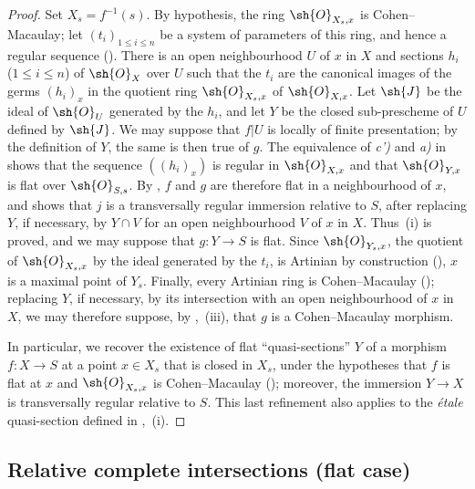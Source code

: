 \begin{proof}
Set $X_s=f^{-1}(s)$. By hypothesis, the ring $\sh{O}_{X_s,x}$ is Cohen--Macaulay; let $(t_i)_{1\leq i\leq n}$ be a system of parameters of this ring, and hence a regular sequence ().
There is an open neighbourhood $U$ of $x$ in $X$ and sections $h_i$ ($1\leq i\leq n$) of $\sh{O}_X$ over $U$ such that the $t_i$ are the canonical images of the germs $(h_i)_x$ in the quotient ring $\sh{O}_{X_s,x}$ of $\sh{O}_{X,x}$.
Let $\sh{J}$ be the ideal of $\sh{O}_U$ generated by the $h_i$, and let $Y$ be the closed sub-prescheme of $U$ defined by $\sh{J}$.
We may suppose that $f|U$ is locally of finite presentation; by the definition of $Y$, the same is then true of $g$.
The equivalence of \emph{c')} and \emph{a)} in  shows that the sequence $((h_i)_x)$ is regular in $\sh{O}_{X,x}$ and that $\sh{O}_{Y,x}$ is flat over $\sh{O}_{S,s}$. By , $f$ and $g$ are therefore flat in a neighbourhood of $x$, and  shows that $j$ is a transversally regular immersion relative to $S$, after replacing $Y$, if necessary, by $Y\cap V$ for an open neighbourhood $V$ of $x$ in $X$.
Thus~(i) is proved, and we may suppose that $g:Y\to S$ is flat.
Since $\sh{O}_{Y_s,x}$, the quotient of $\sh{O}_{X_s,x}$ by the ideal generated by the $t_i$, is Artinian by construction (), $x$ is a maximal point of $Y_s$.
Finally, every Artinian ring is Cohen--Macaulay (); replacing $Y$, if necessary, by its intersection with an open neighbourhood of $x$ in $X$, we may therefore suppose, by ,~(iii), that $g$ is a Cohen--Macaulay morphism.

In particular, we recover the existence of flat ``quasi-sections'' $Y$ of a morphism $f:X\to S$ at a point $x\in X_s$ that is closed in $X_s$, under the hypotheses that $f$ is flat at $x$ and $\sh{O}_{X_s,x}$ is Cohen--Macaulay (); moreover, the immersion $Y\to X$ is transversally regular relative to $S$.
This last refinement also applies to the \emph{\'etale} quasi-section defined in ,~(i).
\end{proof}

\subsection{Relative complete intersections (flat case)}
\label{subsection:IV.19.3}


